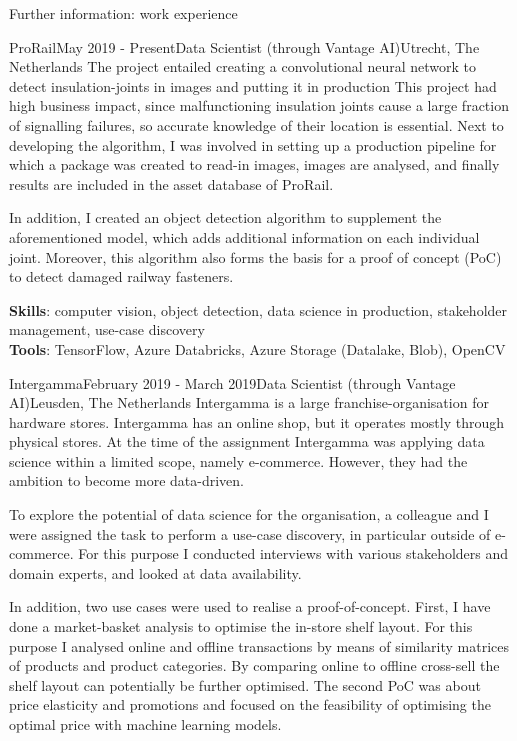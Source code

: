 \begin{rSection}{Further information: work experience}
\begin{rSubsection}{ProRail}{May 2019 - Present}{Data Scientist (through Vantage AI)}{Utrecht, The Netherlands}
The project entailed creating a convolutional neural network to detect insulation-joints in images and putting it in production
This project had high business impact, since malfunctioning insulation joints cause a large fraction of signalling failures,
so accurate knowledge of their location is essential. Next to developing the algorithm, I was involved in setting up a
production pipeline for which a package was created to read-in images, images are analysed, and finally results 
are included in the asset database of ProRail.

In addition, I created an object detection algorithm to supplement the aforementioned model,
which adds additional information on each individual joint. Moreover, this algorithm also forms the basis
for a proof of concept (PoC) to detect damaged railway fasteners.

{\bf Skills}: computer vision, object detection, data science in production, stakeholder management, use-case discovery\\
{\bf Tools}: TensorFlow, Azure Databricks, Azure Storage (Datalake, Blob), OpenCV
\end{rSubsection}

\begin{rSubsection}{Intergamma}{February 2019 - March 2019}{Data Scientist (through Vantage AI)}{Leusden, The Netherlands}
Intergamma is a large franchise-organisation for hardware stores. 
Intergamma has an online shop, but it operates mostly through physical stores. 
At the time of the assignment Intergamma was applying data science within a limited scope, namely e-commerce.
However, they had the ambition to become more data-driven. 

To explore the potential of data science for the organisation,
a colleague and I were assigned the task to perform a use-case discovery, in particular outside of e-commerce.
For this purpose I conducted interviews with various stakeholders and domain experts, and looked at data availability.

In addition, two use cases were used to realise a proof-of-concept.
First, I have done a market-basket analysis to optimise the in-store shelf layout. 
For this purpose I analysed online and offline transactions by means of similarity matrices of products and product categories.
By comparing online to offline cross-sell the shelf layout can potentially be further optimised. 
The second PoC was about price elasticity and promotions and focused on the feasibility of optimising the optimal price
with machine learning models.


\end{rSubsection}
\end{rSection}
